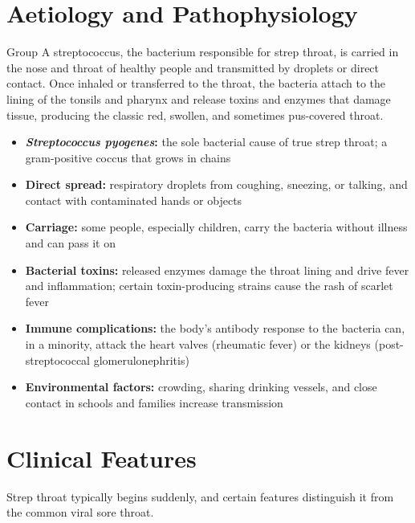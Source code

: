 \section*{Aetiology and Pathophysiology}
Group A streptococcus, the bacterium responsible for strep throat, is carried in the nose and throat of healthy people and transmitted by droplets or direct contact. Once inhaled or transferred to the throat, the bacteria attach to the lining of the tonsils and pharynx and release toxins and enzymes that damage tissue, producing the classic red, swollen, and sometimes pus-covered throat.

\begin{itemize}
    \item \textbf{\textit{Streptococcus pyogenes}:} the sole bacterial cause of true strep throat; a gram-positive coccus that grows in chains
    \item \textbf{Direct spread:} respiratory droplets from coughing, sneezing, or talking, and contact with contaminated hands or objects
    \item \textbf{Carriage:} some people, especially children, carry the bacteria without illness and can pass it on
    \item \textbf{Bacterial toxins:} released enzymes damage the throat lining and drive fever and inflammation; certain toxin-producing strains cause the rash of scarlet fever
    \item \textbf{Immune complications:} the body's antibody response to the bacteria can, in a minority, attack the heart valves (rheumatic fever) or the kidneys (post-streptococcal glomerulonephritis)
    \item \textbf{Environmental factors:} crowding, sharing drinking vessels, and close contact in schools and families increase transmission
\end{itemize}

\section*{Clinical Features}
Strep throat typically begins suddenly, and certain features distinguish it from the common viral sore throat.

